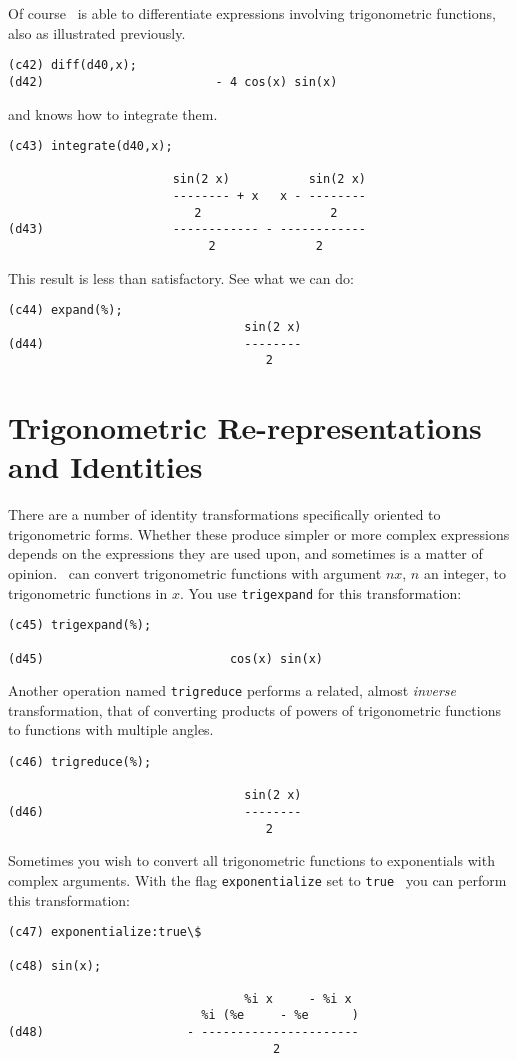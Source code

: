 Of course
\Max\
is able to differentiate expressions
involving trigonometric functions, also as illustrated previously.
\begin{verbatim}
(c42) diff(d40,x);
(d42)                        - 4 cos(x) sin(x)
\end{verbatim}
and knows how to integrate them.
\begin{verbatim}
(c43) integrate(d40,x);

                       sin(2 x)           sin(2 x)
                       -------- + x   x - --------
                          2                  2
(d43)                  ------------ - ------------
                            2              2
\end{verbatim}
This result is less than satisfactory. See what we can do:
\begin{verbatim}
(c44) expand(%);
                                 sin(2 x)
(d44)                            --------
                                    2
\end{verbatim}

\section{Trigonometric Re-representations and Identities}

There are a number of identity transformations specifically oriented
to trigonometric forms. Whether these produce simpler or more
complex expressions depends on the expressions they are used upon,
and sometimes is a matter of opinion.
\Max\
can convert trigonometric functions with
argument $nx$, $n$ an integer, to trigonometric functions in $x$.
You use {\tt trigexpand}
for this transformation:
\begin{verbatim}
(c45) trigexpand(%);

(d45)                          cos(x) sin(x)
\end{verbatim}

Another operation named
{\tt trigreduce}
performs a related, almost {\it inverse} transformation,
that of converting products of
powers of trigonometric functions to functions with multiple
angles. 
\begin{verbatim}
(c46) trigreduce(%);

                                 sin(2 x)
(d46)                            --------
                                    2
\end{verbatim}

Sometimes you wish to convert all trigonometric
functions to exponentials with complex arguments.  With the
flag 
{\tt exponentialize}
set to {\tt true }
you can perform
this transformation:
\begin{verbatim}
(c47) exponentialize:true\$

(c48) sin(x);

                                 %i x     - %i x
                           %i (%e     - %e      )
(d48)                    - ----------------------
                                     2
\end{verbatim}

